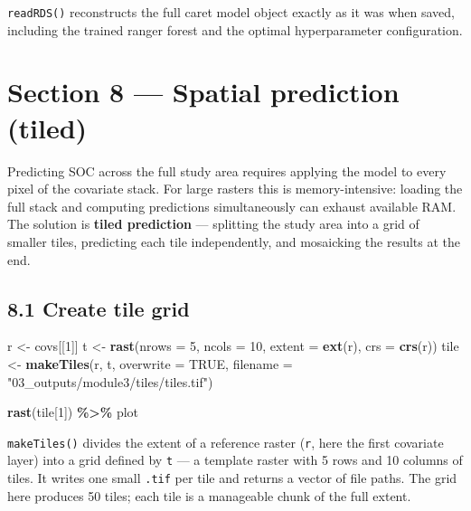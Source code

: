 \documentclass[
  10pt,
  b5paper,
  oneside]{book}
\newenvironment{Shaded}{\begin{snugshade}}{\end{snugshade}}
\newcommand{\AttributeTok}[1]{\textcolor[rgb]{0.13,0.29,0.53}{#1}}
\newcommand{\ConstantTok}[1]{\textcolor[rgb]{0.56,0.35,0.01}{#1}}
\newcommand{\DecValTok}[1]{\textcolor[rgb]{0.00,0.00,0.81}{#1}}
\newcommand{\FunctionTok}[1]{\textcolor[rgb]{0.13,0.29,0.53}{\textbf{#1}}}
\newcommand{\NormalTok}[1]{#1}
\newcommand{\OtherTok}[1]{\textcolor[rgb]{0.56,0.35,0.01}{#1}}
\newcommand{\SpecialCharTok}[1]{\textcolor[rgb]{0.81,0.36,0.00}{\textbf{#1}}}
\newcommand{\StringTok}[1]{\textcolor[rgb]{0.31,0.60,0.02}{#1}}
\begin{document}
\texttt{readRDS()} reconstructs the full caret model object exactly as it was when saved, including the trained ranger forest and the optimal hyperparameter configuration.

\section*{Section 8 --- Spatial prediction (tiled)}\label{section-8-spatial-prediction-tiled}

Predicting SOC across the full study area requires applying the model to every pixel of the covariate stack. For large rasters this is memory-intensive: loading the full stack and computing predictions simultaneously can exhaust available RAM. The solution is \textbf{tiled prediction} --- splitting the study area into a grid of smaller tiles, predicting each tile independently, and mosaicking the results at the end.

\subsection*{8.1 Create tile grid}\label{create-tile-grid}

\begin{Shaded}
\begin{Highlighting}[]
\NormalTok{r    }\OtherTok{\textless{}{-}}\NormalTok{ covs[[}\DecValTok{1}\NormalTok{]]}
\NormalTok{t    }\OtherTok{\textless{}{-}} \FunctionTok{rast}\NormalTok{(}\AttributeTok{nrows =} \DecValTok{5}\NormalTok{, }\AttributeTok{ncols =} \DecValTok{10}\NormalTok{, }\AttributeTok{extent =} \FunctionTok{ext}\NormalTok{(r), }\AttributeTok{crs =} \FunctionTok{crs}\NormalTok{(r))}
\NormalTok{tile }\OtherTok{\textless{}{-}} \FunctionTok{makeTiles}\NormalTok{(r, t, }\AttributeTok{overwrite =} \ConstantTok{TRUE}\NormalTok{,}
                  \AttributeTok{filename =} \StringTok{"03\_outputs/module3/tiles/tiles.tif"}\NormalTok{)}

\FunctionTok{rast}\NormalTok{(tile[}\DecValTok{1}\NormalTok{]) }\SpecialCharTok{\%\textgreater{}\%}\NormalTok{ plot}
\end{Highlighting}
\end{Shaded}

\texttt{makeTiles()} divides the extent of a reference raster (\texttt{r}, here the first covariate layer) into a grid defined by \texttt{t} --- a template raster with 5 rows and 10 columns of tiles. It writes one small \texttt{.tif} per tile and returns a vector of file paths. The grid here produces 50 tiles; each tile is a manageable chunk of the full extent.
\end{document}
